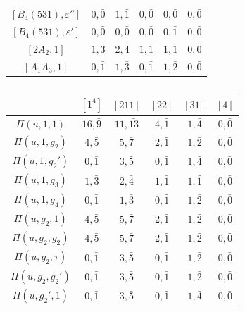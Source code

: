 \begin{landscape}
\begin{table}[h]
\begin{minipage}{0.40\textwidth}
\begin{tabular}{|c|ccccc|}
                $[B_4(531),\varepsilon'']$ & $0,\bar0$ & $1,\bar1$ & $0,\bar0$ & $0,\bar0$ & $0,\bar0$ \\
                $[B_4(531),\varepsilon']$ & $0,\bar0$ & $0,\bar0$ & $0,\bar0$ & $0,\bar1$ & $0,\bar0$ \\
                $[2A_2,1]$ & $1,\bar{3}$ & $2,\bar{4}$ & $1,\bar1$ & $1,\bar1$ & $0,\bar0$ \\
                $[A_1A_3,1]$ & $0,\bar1$ & $1,\bar{3}$ & $0,\bar1$ & $1,\bar2$ & $0,\bar0$ \\\hline
            \end{tabular}
            \caption{}
        \end{minipage}
        \hfill
        \begin{minipage}{0.40\textwidth}
            \centering
            \begin{tabular}{|c|ccccc|}
                \hline
                & $[1^4]$ & $[211]$ & $[22]$ & $[31]$ & $[4]$ \\\hline
                $\Pi(u,1,1)$ & $16,\bar{9}$ & $11,\bar{13}$ & $4,\bar1$ & $1,\bar{4}$ & $0,\bar0$ \\
                $\Pi(u,1,g_2)$ & $4,\bar{5}$ & $5,\bar{7}$ & $2,\bar1$ & $1,\bar2$ & $0,\bar0$ \\
                $\Pi(u,1,g_2')$ & $0,\bar1$ & $3,\bar{5}$ & $0,\bar1$ & $1,\bar{4}$ & $0,\bar0$ \\
                $\Pi(u,1,g_3)$ & $1,\bar{3}$ & $2,\bar{4}$ & $1,\bar1$ & $1,\bar1$ & $0,\bar0$ \\
                $\Pi(u,1,g_4)$ & $0,\bar1$ & $1,\bar{3}$ & $0,\bar1$ & $1,\bar2$ & $0,\bar0$ \\\hline
                $\Pi(u,g_2,1)$ & $4,\bar{5}$ & $5,\bar{7}$ & $2,\bar1$ & $1,\bar2$ & $0,\bar0$ \\
                $\Pi(u,g_2,g_2)$ & $4,\bar{5}$ & $5,\bar{7}$ & $2,\bar1$ & $1,\bar2$ & $0,\bar0$ \\
                $\Pi(u,g_2,\tau)$ & $0,\bar1$ & $3,\bar{5}$ & $0,\bar1$ & $1,\bar2$ & $0,\bar0$ \\
                $\Pi(u,g_2,g_2')$ & $0,\bar1$ & $3,\bar{5}$ & $0,\bar1$ & $1,\bar2$ & $0,\bar0$ \\\hline
                $\Pi(u,g_2',1)$ & $0,\bar1$ & $3,\bar{5}$ & $0,\bar1$ & $1,\bar{4}$ & $0,\bar0$ \\

\end{tabular}
\end{minipage}
\end{table}
\end{landscape}
